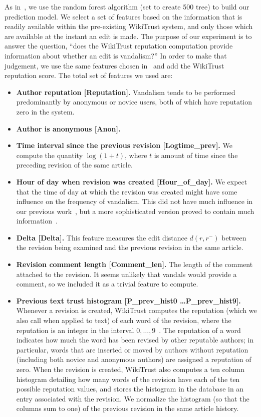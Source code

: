As in~\cite{Adler2011a}, we use the random forest algorithm (set to
create 500 tree) to build our prediction model.
We select a set of features based on the information that is readily
available within the pre-existing WikiTrust system, and only those which
are available at the instant an edit is made.
The purpose of our experiment is to answer the question,
``does the WikiTrust reputation computation provide information about
whether an edit is vandalism?''
In order to make that judgement, we use the same features chosen
in~\cite{Adler2010b} and add the WikiTrust reputation score.
The total set of features we used are:
%
\begin{itemize}

\item \textbf{Author reputation [Reputation].}
Vandalism tends to be performed
predominantly by anonymous or novice users, both of which have
reputation zero in the system.

\item \textbf{Author is anonymous [Anon].}

\item \textbf{Time interval since the previous revision [Logtime\_prev].}
We compute the quantity $\log(1 + t)$, where $t$ is amount of time since
the preceding revision of the same article.

\item \textbf{Hour of day when revision was created [Hour\_of\_day].}
We expect that the time of day at which the revision was created
might have some influence on the frequency of vandalism.
This did not have much influence in our previous work~\cite{Adler2010b},
but a more sophisticated version proved to contain much
information~\cite{West2010}.

\item \textbf{Delta [Delta].}
This feature measures the edit distance $d(r, r^{-})$ between the
revision being examined and the previous revision in the same article.

\item \textbf{Revision comment length [Comment\_len].}
The length of the comment attached to the revision.
It seems unlikely that vandals would provide a comment,
so we included it as a trivial feature to compute.

\item \textbf{Previous text trust histogram [P\_prev\_hist0 \ldots P\_prev\_hist9].}
Whenever a revision is created, WikiTrust computes the reputation (which
we also call  when applied to text) of each word of the
revision, where the reputation is an
integer in the interval $0, \ldots, 9$~\cite{Adler2008b}.  The
reputation of a word indicates how much the word has been revised by
other reputable authors; in particular, words that are inserted or
moved by authors without reputation (including both novice and
anonymous authors) are assigned a reputation of zero.  When the revision is
created, WikiTrust also computes a ten column histogram detailing how
many words of the revision have each of the ten possible reputation
values, and stores the histogram in the database in an entry associated
with the revision.
We normalize the histogram (so that
the columns sum to one) of the previous revision in the same article history.


\end{itemize}
